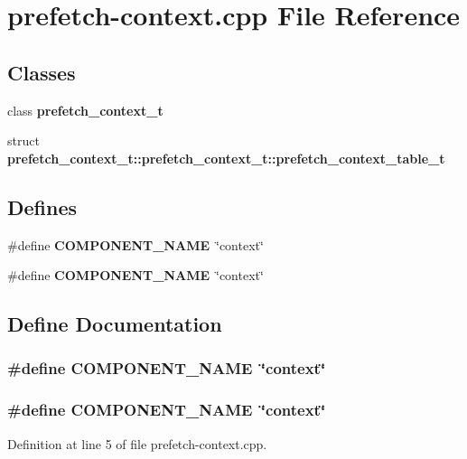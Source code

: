 \section{prefetch-context.cpp File Reference}
\label{prefetch-context_8cpp}
\subsection*{Classes}
\begin{CompactItemize}
\item 
class {\bf prefetch\_\-context\_\-t}
\item 
struct {\bf prefetch\_\-context\_\-t::prefetch\_\-context\_\-t::prefetch\_\-context\_\-table\_\-t}
\end{CompactItemize}
\subsection*{Defines}
\begin{CompactItemize}
\item 
\#define {\bf COMPONENT\_\-NAME}~\char`\"{}context\char`\"{}
\item 
\#define {\bf COMPONENT\_\-NAME}~\char`\"{}context\char`\"{}
\end{CompactItemize}


\subsection{Define Documentation}
\subsubsection[{COMPONENT\_\-NAME}]{\setlength{\rightskip}{0pt plus 5cm}\#define COMPONENT\_\-NAME~\char`\"{}context\char`\"{}}\label{zesto-prefetch_8cpp_9146ade7ce24e3db226a973a59063892}


\subsubsection[{COMPONENT\_\-NAME}]{\setlength{\rightskip}{0pt plus 5cm}\#define COMPONENT\_\-NAME~\char`\"{}context\char`\"{}}\label{prefetch-context_8cpp_9146ade7ce24e3db226a973a59063892}




Definition at line 5 of file prefetch-context.cpp.